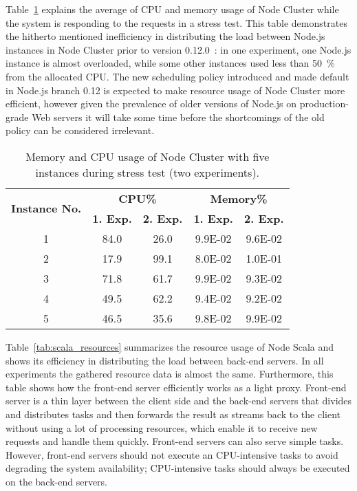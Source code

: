 \documentclass[10pt,conference,letterpaper]{IEEEtran}
\begin{document}
Table~\ref{tab:cluster_resources} explains the average of CPU and
memory usage of Node Cluster while the system is responding to the
requests in a stress test. This table demonstrates the hitherto
mentioned inefficiency in distributing the load between Node.js
instances in Node Cluster prior to version 0.12.0~\cite{StLo01}: in
one experiment, one Node.js instance is almost overloaded, while some
other instances used less than 50~\% from the allocated CPU. The new
scheduling policy introduced and made default in Node.js branch 0.12
is expected to make resource usage of Node Cluster more efficient,
however given the prevalence of older versions of Node.js on
production-grade Web servers it will take some time before the
shortcomings of the old policy can be considered irrelevant.

\begin{table}
  \caption{Memory and CPU usage of Node Cluster with five instances during stress test (two experiments).}
  \label{tab:cluster_resources}
  \centering
    \begin{tabular}{|c|c|c||c|c|}
      \hline
      \multirow{2}{*}{\textbf{Instance No.}} & \multicolumn{2}{|c|}{\textbf{CPU\%} }& \multicolumn{2}{|c|}{\textbf{Memory\%} } \\
      \cline{2-5}
      & \textbf{ 1. Exp. } & \textbf{ 2. Exp. } & \textbf{ 1. Exp.} & \textbf{ 2. Exp.} \\
      \hline
      1 & 84.0   & 26.0 & 9.9E-02 & 9.6E-02 \\
      2 & 17.9 & 99.1 & 8.0E-02 & 1.0E-01 \\
      3 & 71.8 & 61.7 & 9.9E-02 & 9.3E-02 \\
      4 & 49.5 & 62.2 & 9.4E-02 & 9.2E-02 \\
      5 & 46.5 & 35.6 & 9.8E-02 & 9.9E-02 \\
      \hline
    \end{tabular}
\end{table}

Table~\ref{tab:scala_resources} summarizes the resource usage of Node
Scala and shows its efficiency in distributing the load between
back-end servers. In all experiments the gathered resource data is
almost the same. Furthermore, this table shows how the front-end
server efficiently works as a light proxy. Front-end server is a thin
layer between the client side and the back-end servers that divides
and distributes tasks and then forwards the result as streams back to
the client without using a lot of processing resources, which enable
it to receive new requests and handle them quickly. Front-end servers
can also serve simple tasks. However, front-end servers should not
execute an CPU-intensive tasks to avoid degrading the system
availability; CPU-intensive tasks should always be executed on the
back-end servers.
\end{document}
